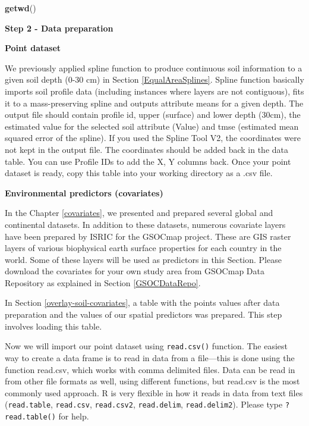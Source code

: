 \documentclass[10pt,b5paper,]{book}
\newenvironment{Shaded}{\begin{snugshade}}{\end{snugshade}}
\newcommand{\KeywordTok}[1]{\textcolor[rgb]{0.13,0.29,0.53}{\textbf{#1}}}
\newcommand{\NormalTok}[1]{#1}
\theoremstyle{definition}
\theoremstyle{definition}
\theoremstyle{definition}
\theoremstyle{remark}
\begin{document}
\begin{Shaded}
\begin{Highlighting}[]
\KeywordTok{getwd}\NormalTok{()}
\end{Highlighting}
\end{Shaded}

\textbf{Step 2 - Data preparation}

\textbf{Point dataset}

We previously applied spline function to produce continuous soil
information to a given soil depth (0-30 cm) in Section
\ref{EqualAreaSplines}. Spline function basically imports soil profile
data (including instances where layers are not contiguous), fits it to a
mass-preserving spline and outputs attribute means for a given depth.
The output file should contain profile id, upper (surface) and lower
depth (30cm), the estimated value for the selected soil attribute
(Value) and tmse (estimated mean squared error of the spline). If you
used the Spline Tool V2, the coordinates were not kept in the output
file. The coordinates should be added back in the data table. You can
use Profile IDs to add the X, Y columns back. Once your point dataset is
ready, copy this table into your working directory as a .csv file.

\textbf{Environmental predictors (covariates)}

In the Chapter \ref{covariates}, we presented and prepared several
global and continental datasets. In addition to these datasets, numerous
covariate layers have been prepared by ISRIC for the GSOCmap project.
These are GIS raster layers of various biophysical earth surface
properties for each country in the world. Some of these layers will be
used as predictors in this Section. Please download the covariates for
your own study area from GSOCmap Data Repository as explained in Section
\ref{GSOCDataRepo}.

In Section \ref{overlay-soil-covariates}, a table with the points values
after data preparation and the values of our spatial predictors was
prepared. This step involves loading this table.

Now we will import our point dataset using \texttt{read.csv()} function.
The easiest way to create a data frame is to read in data from a
file---this is done using the function read.csv, which works with comma
delimited files. Data can be read in from other file formats as well,
using different functions, but read.csv is the most commonly used
approach. R is very flexible in how it reads in data from text files
(\texttt{read.table}, \texttt{read.csv}, \texttt{read.csv2},
\texttt{read.delim}, \texttt{read.delim2}). Please type
\texttt{?read.table()} for help.
\end{document}
